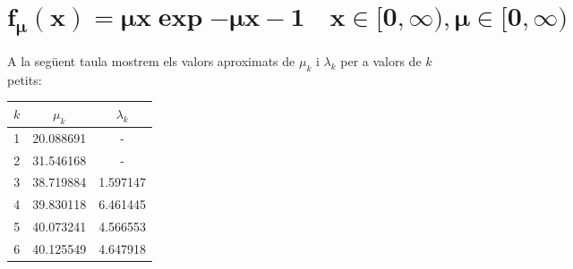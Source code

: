 \documentclass[a4paper]{article}
\theoremstyle{definition}
\begin{document}
\newpage

\section{\texorpdfstring{$\boldsymbol{f_\mu(x)=\mu x\exp{-\mu x-1}\quad x\in[0,\infty), \mu\in[0,\infty)}$}{f6}}
A la següent taula mostrem els valors aproximats de $\mu_k$ i $\lambda_k$ per a valors de $k$ petits:
\begin{table}[ht]
  \centering
  \begin{tabular}{c|c|c}
    $k$ & $\mu_k$   & $\lambda_k$ \\
    \hline
    \hline
    1   & 20.088691 & -           \\
    2   & 31.546168 & -           \\
    3   & 38.719884 & 1.597147    \\
    4   & 39.830118 & 6.461445    \\
    5   & 40.073241 & 4.566553    \\
    6   & 40.125549 & 4.647918    \\
  \end{tabular}
\end{table}
\end{document}
